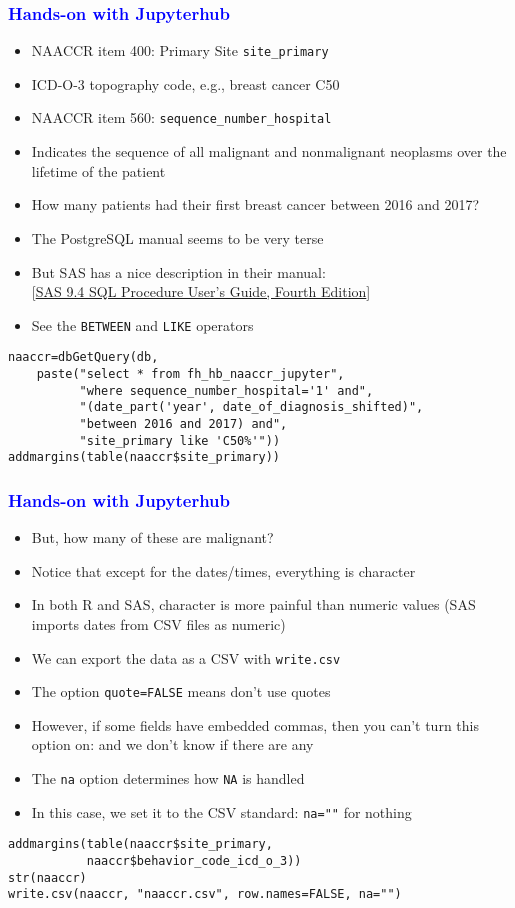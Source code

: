 \documentclass[11pt,pdftex,dvipsnames,usenames]{beamer}
\begin{document}
\begin{frame}[fragile]\frametitle{\bf\textcolor{blue}{Hands-on with Jupyterhub}}
\begin{itemize}
\item NAACCR item 400: Primary Site \texttt{site\_primary}
\item ICD-O-3 topography code, e.g., breast cancer C50
\item NAACCR item 560: \texttt{sequence\_number\_hospital}
\item Indicates the sequence of all malignant and nonmalignant
neoplasms over the lifetime of the patient
\item How many patients had their first breast cancer between
2016 and 2017?
\item The PostgreSQL manual seems to be very terse
\item But SAS has a nice description in their manual: \\
\textcolor{PineGreen}{[\href{https://documentation.sas.com/doc/en/pgmsascdc/9.4_3.5/sqlproc/titlepage.htm}{SAS 9.4 SQL Procedure User’s Guide, Fourth Edition}]}
\item See the \texttt{BETWEEN} and \texttt{LIKE} operators
\end{itemize}
\begin{verbatim}
naaccr=dbGetQuery(db, 
    paste("select * from fh_hb_naaccr_jupyter",
          "where sequence_number_hospital='1' and",
          "(date_part('year', date_of_diagnosis_shifted)",
          "between 2016 and 2017) and",
          "site_primary like 'C50%'"))
addmargins(table(naaccr$site_primary))
\end{verbatim}
\end{frame}


\begin{frame}[fragile]\frametitle{\bf\textcolor{blue}{Hands-on with Jupyterhub}}
\begin{itemize}
\item But, how many of these are malignant?
\item Notice that except for the dates/times,
everything is character
\item In both R and SAS, character is more painful than numeric
values (SAS imports dates from CSV files as numeric)
\item We can export the data as a CSV with \texttt{write.csv}
\item The option \texttt{quote=FALSE} means don't use quotes
\item However, if some fields have embedded commas, then you
can't turn this option on: and we don't know if there are any
\item The \texttt{na} option determines how \texttt{NA} is handled
\item In this case, we set it to the CSV standard: \texttt{na=""}
for nothing 
\end{itemize}
\begin{verbatim}
addmargins(table(naaccr$site_primary, 
           naaccr$behavior_code_icd_o_3))
str(naaccr)
write.csv(naaccr, "naaccr.csv", row.names=FALSE, na="") 
\end{verbatim}
\end{frame}
\end{document}
